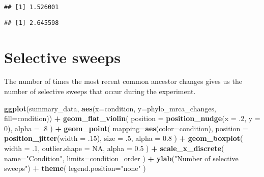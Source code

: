 \documentclass[]{book}
\newenvironment{Shaded}{\begin{snugshade}}{\end{snugshade}}
\newcommand{\DataTypeTok}[1]{\textcolor[rgb]{0.13,0.29,0.53}{#1}}
\newcommand{\DecValTok}[1]{\textcolor[rgb]{0.00,0.00,0.81}{#1}}
\newcommand{\FloatTok}[1]{\textcolor[rgb]{0.00,0.00,0.81}{#1}}
\newcommand{\KeywordTok}[1]{\textcolor[rgb]{0.13,0.29,0.53}{\textbf{#1}}}
\newcommand{\NormalTok}[1]{#1}
\newcommand{\OperatorTok}[1]{\textcolor[rgb]{0.81,0.36,0.00}{\textbf{#1}}}
\newcommand{\OtherTok}[1]{\textcolor[rgb]{0.56,0.35,0.01}{#1}}
\newcommand{\StringTok}[1]{\textcolor[rgb]{0.31,0.60,0.02}{#1}}
\begin{document}
\begin{verbatim}
## [1] 1.526001
\end{verbatim}

\begin{Shaded}
\end{Shaded}

\begin{verbatim}
## [1] 2.645598
\end{verbatim}

\hypertarget{selective-sweeps}{%
\section{Selective sweeps}\label{selective-sweeps}}

The number of times the most recent common ancestor changes gives us the number of selective sweeps that occur during the experiment.

\begin{Shaded}
\begin{Highlighting}[]
\KeywordTok{ggplot}\NormalTok{(summary_data, }\KeywordTok{aes}\NormalTok{(}\DataTypeTok{x=}\NormalTok{condition, }\DataTypeTok{y=}\NormalTok{phylo_mrca_changes, }\DataTypeTok{fill=}\NormalTok{condition)) }\OperatorTok{+}
\StringTok{  }\KeywordTok{geom_flat_violin}\NormalTok{(}
    \DataTypeTok{position =} \KeywordTok{position_nudge}\NormalTok{(}\DataTypeTok{x =} \FloatTok{.2}\NormalTok{, }\DataTypeTok{y =} \DecValTok{0}\NormalTok{),}
    \DataTypeTok{alpha =} \FloatTok{.8}
\NormalTok{  ) }\OperatorTok{+}
\StringTok{  }\KeywordTok{geom_point}\NormalTok{(}
    \DataTypeTok{mapping=}\KeywordTok{aes}\NormalTok{(}\DataTypeTok{color=}\NormalTok{condition),}
    \DataTypeTok{position =} \KeywordTok{position_jitter}\NormalTok{(}\DataTypeTok{width =} \FloatTok{.15}\NormalTok{),}
    \DataTypeTok{size =} \FloatTok{.5}\NormalTok{,}
    \DataTypeTok{alpha =} \FloatTok{0.8}
\NormalTok{  ) }\OperatorTok{+}
\StringTok{  }\KeywordTok{geom_boxplot}\NormalTok{(}
    \DataTypeTok{width =} \FloatTok{.1}\NormalTok{,}
    \DataTypeTok{outlier.shape =} \OtherTok{NA}\NormalTok{,}
    \DataTypeTok{alpha =} \FloatTok{0.5}
\NormalTok{  ) }\OperatorTok{+}
\StringTok{  }\KeywordTok{scale_x_discrete}\NormalTok{(}
    \DataTypeTok{name=}\StringTok{"Condition"}\NormalTok{,}
    \DataTypeTok{limits=}\NormalTok{condition_order}
\NormalTok{  ) }\OperatorTok{+}
\StringTok{  }\KeywordTok{ylab}\NormalTok{(}\StringTok{"Number of selective sweeps"}\NormalTok{) }\OperatorTok{+}
\StringTok{  }\KeywordTok{theme}\NormalTok{(}
    \DataTypeTok{legend.position=}\StringTok{"none"}
\NormalTok{  )}
\end{Highlighting}
\end{Shaded}
\end{document}
